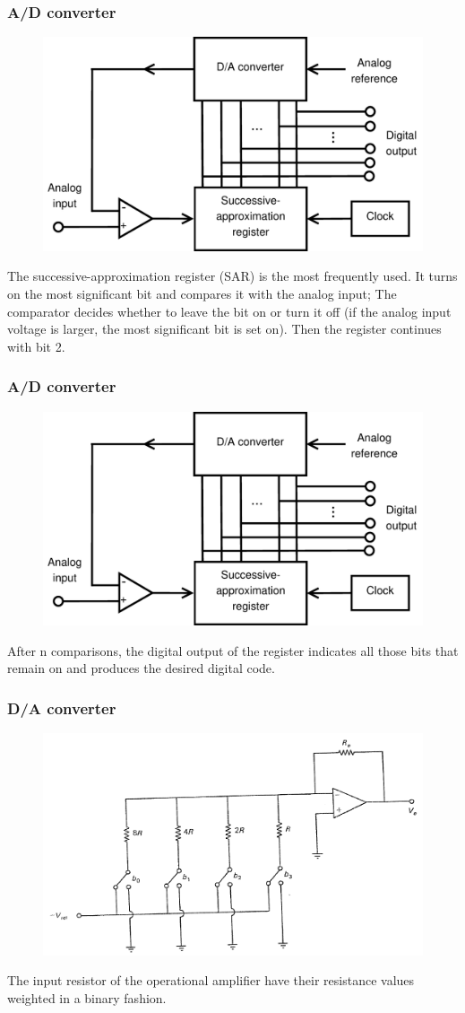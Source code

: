 \begin{frame}
	\frametitle{A/D converter}
	\begin{figure}
		\includegraphics[width=0.6\linewidth]{ADconverter}
	\end{figure}
	The successive-approximation 
	register (SAR) is the most frequently used. It turns on the most significant bit and compares it with the analog input; The comparator decides whether to leave the bit on or turn it off (if the analog input voltage is larger, the most significant bit is set on). Then the register continues with bit 2.
\end{frame}

\begin{frame}
	\frametitle{A/D converter}
	\begin{figure}
		\includegraphics[width=0.8\linewidth]{ADconverter}
	\end{figure}
	After n comparisons, the digital output of the register indicates all those bits that remain on and produces the desired digital code.
\end{frame}

\begin{frame}
	\frametitle{D/A converter}
	\vspace{-4ex}
	\begin{figure}
		\includegraphics[width=0.8\linewidth]{DAconverter}
	\end{figure}
	The input resistor of the operational amplifier have their resistance values weighted in a binary fashion. 
\end{frame}

